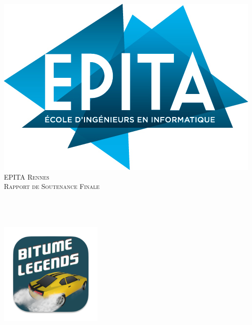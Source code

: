 \graphicspath{{../Medias}}

\begin{titlepage}
  \begin{sffamily}
  \begin{center}

  
    \includegraphics[scale=0.3]{epita.png}\\[1.5cm]

    \textsc{\huge EPITA Rennes}\\[0.5cm]

    \textsc{\Large Rapport de Soutenance Finale}\\[1.5cm]

    \HRule \\[0.4cm]
     { \LARGE \bfseries \btmlgs \\[0.4cm] }

    \HRule \\[2cm]
    \includegraphics[scale=0.5]{logo192.png}
     \\[0.5cm]
    \textsc{\Large \CEX}\\[1.5cm]


\end{center}
\end{sffamily}
\end{titlepage}
